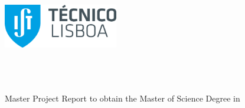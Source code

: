 
\begin{titlepage}
\includegraphics[width=5cm]{images/ist_logo}~\\
%
\if{}
  \vspace*{\finalLogoSpacing}
\else
  \vspace*{\draftLogoSpacing}
\fi

\begin{center}
{\LARGE \textbf{\Title}}\\[1.0cm]
{\Large \Subtitle}\\[1.0cm]
{\Large \textbf{\StudentName}}\\[1.0cm]
{\large Master Project Report to obtain the Master of Science Degree in}\\[1.0cm]
{\LARGE \textbf{\DegreeName}}\\[1.0cm]


\end{center}
\end{titlepage}
